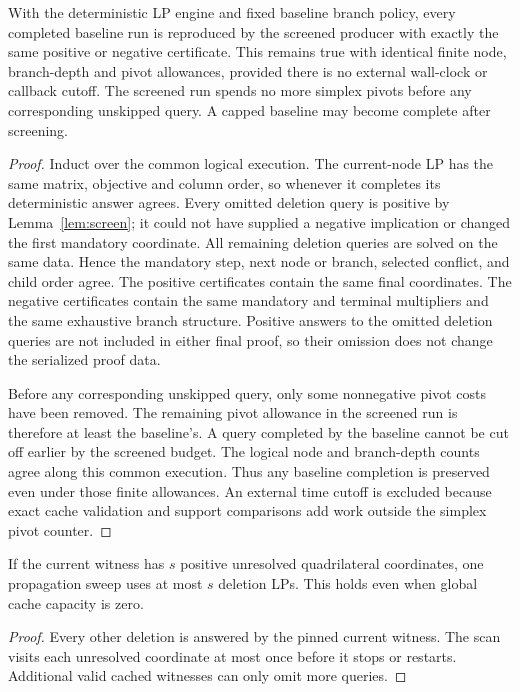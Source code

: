\begin{theorem}\label{thm:lp-policy}
With the deterministic LP engine and fixed baseline branch policy, every
completed baseline run is reproduced by the screened producer with exactly
the same positive or negative certificate. This remains true with identical
finite node, branch-depth and pivot allowances, provided there is no external
wall-clock or callback cutoff. The screened run spends no more simplex pivots
before any corresponding unskipped query. A capped baseline may become
complete after screening.
\end{theorem}
\begin{proof}
Induct over the common logical execution. The current-node LP has the same
matrix, objective and column order, so whenever it completes its deterministic
answer agrees. Every omitted deletion query is positive by
Lemma~\ref{lem:screen}; it could not have supplied a negative implication or
changed the first mandatory coordinate. All remaining deletion queries are
solved on the same data. Hence the mandatory step, next node or branch,
selected conflict, and child order agree. The positive certificates contain
the same final coordinates. The negative certificates contain the same
mandatory and terminal multipliers and the same exhaustive branch structure.
Positive answers to the omitted deletion queries are not included in either
final proof, so their omission does not change the serialized proof data.

Before any corresponding unskipped query, only some nonnegative pivot costs
have been removed. The remaining pivot allowance in the screened run is
therefore at least the baseline's. A query completed by the baseline cannot
be cut off earlier by the screened budget. The logical node and branch-depth
counts agree along this common execution. Thus any baseline completion is
preserved even under those finite allowances. An external time cutoff is
excluded because exact cache validation and support comparisons add work
outside the simplex pivot counter.
\end{proof}

\begin{corollary}\label{cor:lp-support}
If the current witness has $s$ positive unresolved quadrilateral coordinates,
one propagation sweep uses at most $s$ deletion LPs. This holds even when
global cache capacity is zero.
\end{corollary}
\begin{proof}
Every other deletion is answered by the pinned current witness. The scan
visits each unresolved coordinate at most once before it stops or restarts.
Additional valid cached witnesses can only omit more queries.
\end{proof}

